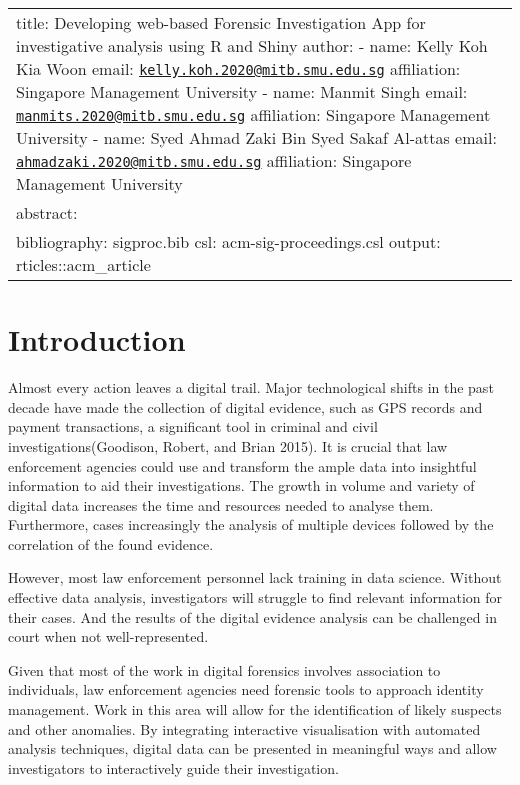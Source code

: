 \documentclass{acm_proc_article-sp}
\author{
}
\date{}
\begin{document}
\begin{longtable}[]{@{}
  >{\raggedright\arraybackslash}p{}@{}}
\toprule
\endhead
title: Developing web-based Forensic Investigation App for investigative
analysis using R and Shiny author: - name: Kelly Koh Kia Woon email:
\href{mailto:kelly.koh.2020@mitb.smu.edu.sg}{\nolinkurl{kelly.koh.2020@mitb.smu.edu.sg}}
affiliation: Singapore Management University - name: Manmit Singh email:
\href{mailto:manmits.2020@mitb.smu.edu.sg}{\nolinkurl{manmits.2020@mitb.smu.edu.sg}}
affiliation: Singapore Management University - name: Syed Ahmad Zaki Bin
Syed Sakaf Al-attas email:
\href{mailto:ahmadzaki.2020@mitb.smu.edu.sg}{\nolinkurl{ahmadzaki.2020@mitb.smu.edu.sg}}
affiliation: Singapore Management University \\
abstract: \textbar{} \\
bibliography: sigproc.bib csl: acm-sig-proceedings.csl output:
rticles::acm\_article \\
\bottomrule
\end{longtable}

\hypertarget{introduction}{%
\section{Introduction}\label{introduction}}

Almost every action leaves a digital trail. Major technological shifts
in the past decade have made the collection of digital evidence, such as
GPS records and payment transactions, a significant tool in criminal and
civil investigations(Goodison, Robert, and Brian 2015). It is crucial
that law enforcement agencies could use and transform the ample data
into insightful information to aid their investigations. The growth in
volume and variety of digital data increases the time and resources
needed to analyse them. Furthermore, cases increasingly the analysis of
multiple devices followed by the correlation of the found evidence.

However, most law enforcement personnel lack training in data science.
Without effective data analysis, investigators will struggle to find
relevant information for their cases. And the results of the digital
evidence analysis can be challenged in court when not well-represented.

Given that most of the work in digital forensics involves association to
individuals, law enforcement agencies need forensic tools to approach
identity management. Work in this area will allow for the identification
of likely suspects and other anomalies. By integrating interactive
visualisation with automated analysis techniques, digital data can be
presented in meaningful ways and allow investigators to interactively
guide their investigation.
\end{document}
